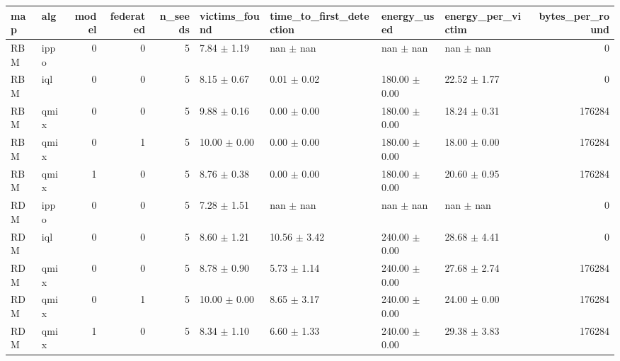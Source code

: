 \begin{tabular}{llrrrllllr}
\toprule
map & alg & model & federated & n_seeds & victims_found & time_to_first_detection & energy_used & energy_per_victim & bytes_per_round \\
\midrule
RBM & ippo & 0 & 0 & 5 & 7.84 $\pm$ 1.19 & nan $\pm$ nan & nan $\pm$ nan & nan $\pm$ nan & 0 \\
RBM & iql & 0 & 0 & 5 & 8.15 $\pm$ 0.67 & 0.01 $\pm$ 0.02 & 180.00 $\pm$ 0.00 & 22.52 $\pm$ 1.77 & 0 \\
RBM & qmix & 0 & 0 & 5 & 9.88 $\pm$ 0.16 & 0.00 $\pm$ 0.00 & 180.00 $\pm$ 0.00 & 18.24 $\pm$ 0.31 & 176284 \\
RBM & qmix & 0 & 1 & 5 & 10.00 $\pm$ 0.00 & 0.00 $\pm$ 0.00 & 180.00 $\pm$ 0.00 & 18.00 $\pm$ 0.00 & 176284 \\
RBM & qmix & 1 & 0 & 5 & 8.76 $\pm$ 0.38 & 0.00 $\pm$ 0.00 & 180.00 $\pm$ 0.00 & 20.60 $\pm$ 0.95 & 176284 \\
RDM & ippo & 0 & 0 & 5 & 7.28 $\pm$ 1.51 & nan $\pm$ nan & nan $\pm$ nan & nan $\pm$ nan & 0 \\
RDM & iql & 0 & 0 & 5 & 8.60 $\pm$ 1.21 & 10.56 $\pm$ 3.42 & 240.00 $\pm$ 0.00 & 28.68 $\pm$ 4.41 & 0 \\
RDM & qmix & 0 & 0 & 5 & 8.78 $\pm$ 0.90 & 5.73 $\pm$ 1.14 & 240.00 $\pm$ 0.00 & 27.68 $\pm$ 2.74 & 176284 \\
RDM & qmix & 0 & 1 & 5 & 10.00 $\pm$ 0.00 & 8.65 $\pm$ 3.17 & 240.00 $\pm$ 0.00 & 24.00 $\pm$ 0.00 & 176284 \\
RDM & qmix & 1 & 0 & 5 & 8.34 $\pm$ 1.10 & 6.60 $\pm$ 1.33 & 240.00 $\pm$ 0.00 & 29.38 $\pm$ 3.83 & 176284 \\
\bottomrule
\end{tabular}
